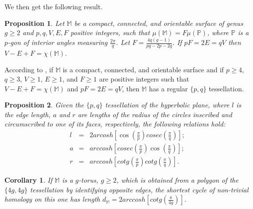 \documentclass[%
reprint,
amsmath,amssymb,
aps,
]{revtex4-2}
\newtheorem{proposition}{Proposition}%
\newtheorem{corollary}{Corollary}
\newcommand{\M}{\mathbb{M}}
\begin{document}
We then get the following result.

\begin{proposition} \label{propo:equivalencia-relacoes-com-face-para-teo-kulkarni} 
	Let $\M$ be a compact, connected, and orientable surface of genus $ g\geq 2 $ and $ p,q,V,E,F $ positive integers, such that $\mu(\M) = F\mu(\mathbb{P}) $, where $\mathbb{P} $ is a $ p $-gon of interior angles measuring $ \frac{2\pi}q $. Let $F=\frac{4q(g-1)}{pq-2p-2q}$. If $ pF=2E=qV$ then $ V-E+F=\chi(\M)$. 
\end{proposition}

According to \cite{kulkarni-regular}, if $\M $ is a compact, connected, and orientable surface and if $p\geq 4 $, $q\geq 3 $, $V\geq 1 $, $E\geq 1 $, and $F\geq 1 $ are positive integers such that $V-E+F=\chi(\M) $ and $pF=2E=qV $, then $\M$ has a regular  $\{p,q\}$ tessellation.

\begin{proposition}\label{propo:medidas-l-a-r-tesselacao-regular} 	
	Given the $\{p,q\}$ tessellation of the hyperbolic plane, where $ l $ is the edge length, $ a$ and $ r$ are lengths of the radius of the circles inscribed and circumscribed to one of its faces, respectively, the following relations hold:	
	\begin{eqnarray}
		l&=& 2 arcosh\left[  \cos\displaystyle\left(  \frac{\pi}{p}\right) cosec\displaystyle\left( \frac \pi q \right) \right];   \label{formula-l-tesselacao-regular}\\
		a&=&   arccosh \left[ cosec\displaystyle\left(  \frac{\pi}{p}\right) \cos\displaystyle\left( \frac \pi q \right)  \right];  \label{formula-a-tesselacao-regular}\\		
		r&=&  arccosh\left[ cotg \displaystyle\left(  \frac{\pi}{p}\right) cotg\displaystyle\left( \frac \pi q \right) 	 \right].    \label{formula-r-tesselacao-regular}
	\end{eqnarray}
\end{proposition}



\begin{corollary}\label{cor:comprimento-geodesica-lados-opostos-poligono-que-fornece-superficie-g-toro} 
	If $ \M $ is a $ g $-torus, $ g\geq 2 $, which is obtained from a polygon of the $\{4g,4g\}$ tessellation by identifying opposite edges, the shortest cycle of non-trivial homology on this one has length $ d_\M = 2 arccosh\left[cotg \displaystyle\left( \frac{\pi}{4g}\right) \right]$.	
\end{corollary}
\end{document}
